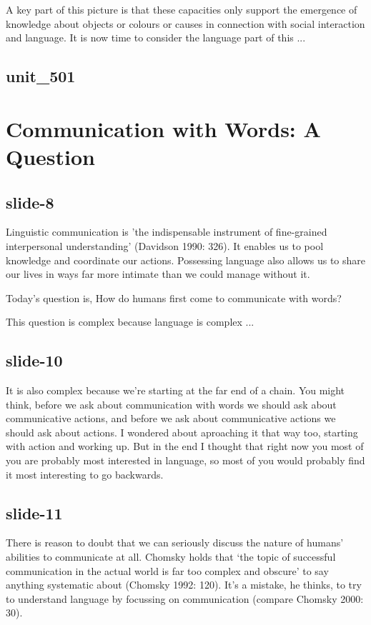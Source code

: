 \documentclass[12pt,\papersize]{extarticle}
\begin{document}
A key part of this picture is that these capacities only support the emergence of knowledge 
about objects or colours or causes in connection with social interaction and language.
It is now time to consider the language part of this ...
 
\subsection{unit\_501}
 
 
\section{Communication with Words: A Question}
 
\subsection{slide-8}
Linguistic communication is 'the indispensable instrument of fine-grained interpersonal 
understanding' (Davidson 1990: 326).
It enables us to pool knowledge and coordinate our actions.
Possessing language also allows us to share our lives in ways far more intimate than we could 
manage without it.
 
Today's question is,
How do humans first come to communicate with words?

 
This question is complex because language is complex ...
 
\subsection{slide-10}
It is also complex because we're starting at the far end of a chain.
You might think, before we ask about communication with words we should ask about communicative 
actions, and before we ask about communicative actions we should ask about actions.
I wondered about aproaching it that way too, starting with action and working up.
But in the end I thought that right now you most of you are probably most interested in language, so most of you would probably find it most interesting to go backwards.
 
\subsection{slide-11}
There is reason to doubt that we can seriously discuss the nature of humans' abilities to 
communicate at all.
Chomsky holds that ‘the topic of successful communication in the actual world is far too 
complex and obscure’ to say anything systematic about (Chomsky 1992: 120). It’s a mistake, he 
thinks, to try to understand language by focussing on communication (compare Chomsky 2000: 30).
 
\end{document}
